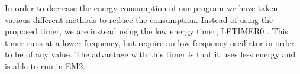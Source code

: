 
In order to decrease the energy consumption of our program we have taken various different methods to reduce the consumption. Instead of using the proposed timer\cite{compendium}, we are instead using the low energy timer, LETIMER0 \cite{EFM32GG-rm}. This timer runs at a lower frequency, but require an low frequency oscillator in order to be of any value. The advantage with this timer is that it uses less energy and is able to run in EM2.  